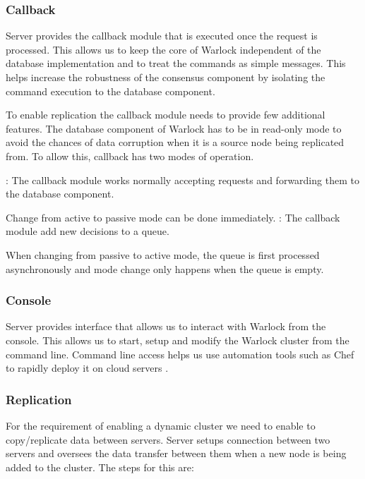 \subsubsection{Callback}

Server provides the callback module that is executed once the request is
processed. This allows us to keep the core of Warlock independent of the
database implementation and to treat the commands as simple messages. This
helps increase the robustness of the consensus component by isolating the
command execution to the database component.

To enable replication  the
callback module needs to provide few additional features. The database
component of Warlock has to be in read-only mode to avoid the chances of
data corruption when it is a source node being replicated from. To allow
this, callback has two modes of operation.

\begin{itemize}
    : The callback module works normally accepting requests
    and forwarding them to the database component.

    Change from active to passive mode can be done immediately.
    : The callback module add new decisions to a queue.

    When changing from passive to active mode, the queue is first processed
    asynchronously and mode change only happens when the queue is empty.
\end{itemize}

\subsubsection{Console}

Server provides interface that allows us to interact with Warlock from the
console. This allows us to start, setup and modify the Warlock cluster from
the command line. Command line access helps us use automation tools such as
Chef \citep{Chef} to rapidly deploy it on cloud servers
\citep{Armbrust:2010:VCC:1721654.1721672, amazonAWS}.

\subsubsection{Replication}
\label{section:analysis.design.replication}

For the requirement  of enabling a dynamic
cluster we need to enable to copy/replicate data between servers.
Server setups connection between two servers and oversees the data transfer
between them when a new node is being added to the cluster. The steps for
this are:

